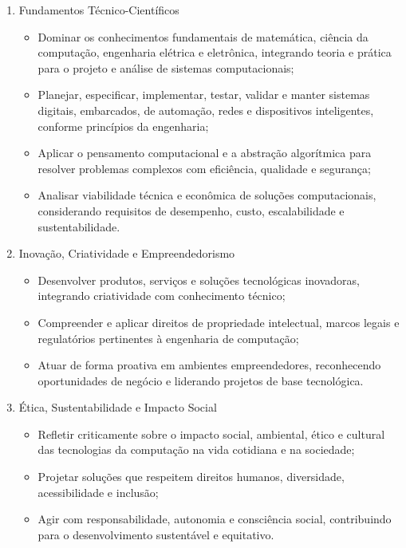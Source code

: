 \begin{enumerate}
\item Fundamentos Técnico-Científicos

\begin{itemize}
    \item Dominar os conhecimentos fundamentais de matemática, ciência da computação, engenharia elétrica e eletrônica, integrando teoria e prática para o projeto e análise de sistemas computacionais;
    \item Planejar, especificar, implementar, testar, validar e manter sistemas digitais, embarcados, de automação, redes e dispositivos inteligentes, conforme princípios da engenharia;
    \item Aplicar o pensamento computacional e a abstração algorítmica para resolver problemas complexos com eficiência, qualidade e segurança;
    \item Analisar viabilidade técnica e econômica de soluções computacionais, considerando requisitos de desempenho, custo, escalabilidade e sustentabilidade.
\end{itemize}
    
\item Inovação, Criatividade e Empreendedorismo

\begin{itemize}
    \item Desenvolver produtos, serviços e soluções tecnológicas inovadoras, integrando criatividade com conhecimento técnico;
    \item Compreender e aplicar direitos de propriedade intelectual, marcos legais e regulatórios pertinentes à engenharia de computação;
    \item Atuar de forma proativa em ambientes empreendedores, reconhecendo oportunidades de negócio e liderando projetos de base tecnológica.
\end{itemize}
    
\item Ética, Sustentabilidade e Impacto Social

\begin{itemize}
    \item Refletir criticamente sobre o impacto social, ambiental, ético e cultural das tecnologias da computação na vida cotidiana e na sociedade;
    \item Projetar soluções que respeitem direitos humanos, diversidade, acessibilidade e inclusão;
    \item Agir com responsabilidade, autonomia e consciência social, contribuindo para o desenvolvimento sustentável e equitativo.
\end{itemize}
    

\end{enumerate}
